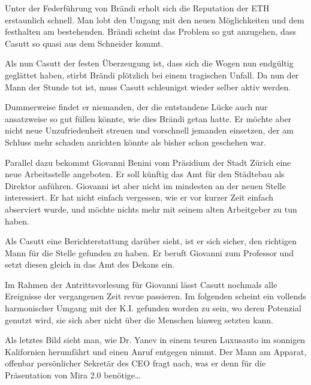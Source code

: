 \documentclass[11pt,a4paper,ngerman]{scrreprt}
\begin{document}
Unter der Federführung von Brändi erholt sich die Reputation der ETH erstaunlich
schnell. Man lobt den Umgang mit den neuen Möglichkeiten und dem festhalten am
bestehenden. Brändi scheint das Problem so gut anzugehen, dass Casutt so quasi
aus dem Schneider kommt.

Als nun Casutt der festen Überzeugung ist, dass sich die Wogen nun endgültig
geglättet haben, stirbt Brändi plötzlich bei einem tragischen Unfall. Da nun der
Mann der Stunde tot ist, muss Casutt schleunigst wieder selber aktiv werden.

Dummerweise findet er niemanden, der die entstandene Lücke auch nur ansatzweise
so gut füllen könnte, wie dies Brändi getan hatte. Er möchte aber nicht neue
Unzufriedenheit streuen und vorschnell jemanden einsetzen, der am Schluss mehr
schaden anrichten könnte als bisher schon geschehen war.

Parallel dazu bekommt Giovanni Benini vom Präsidium der Stadt Zürich eine neue
Arbeitsstelle angeboten. Er soll künftig das Amt für den Städtebau als Direktor
anführen. Giovanni ist aber nicht im mindesten an der neuen Stelle
interessiert. Er hat nicht einfach vergessen, wie er vor kurzer Zeit einfach
abserviert wurde, und möchte nichts mehr mit seinem alten Arbeitgeber zu tun
haben.

Als Casutt eine Berichterstattung darüber sieht, ist er sich sicher, den
richtigen Mann für die Stelle gefunden zu haben. Er beruft Giovanni zum
Professor und setzt diesen gleich in das Amt des Dekans ein.

Im Rahmen der Antrittsvorlesung für Giovanni lässt Casutt nochmals alle
Ereignisse der vergangenen Zeit revue passieren. Im folgenden scheint ein
vollends harmonischer Umgang mit der K.I. gefunden worden zu sein, wo deren
Potenzial genutzt wird, sie sich aber nicht über die Menschen hinweg setzten
kann.

Als letztes Bild sieht man, wie Dr. Yanev in einem teuren Luxusauto im sonnigen
Kalifornien herumfährt und einen Anruf entgegen nimmt. Der Mann am Apparat,
offenbar persönlicher Sekretär des CEO fragt nach, was er denn für die
Präsentation von Mira 2.0 benötige\ldots{}
\end{document}
